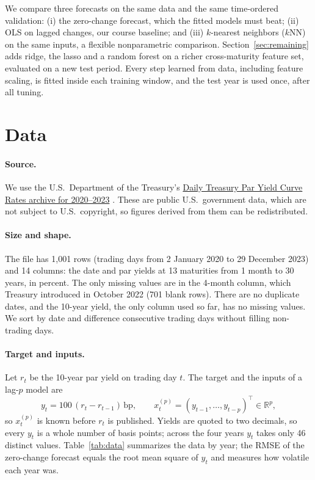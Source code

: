 \documentclass{article}
\newcommand{\bp}{\,\mathrm{bp}}
\begin{document}
We compare three forecasts on the same data and the same time-ordered validation: (i) the zero-change forecast, which the fitted models must beat; (ii) OLS on lagged changes, our course baseline; and (iii) $k$-nearest neighbors ($k$NN) on the same inputs, a flexible nonparametric comparison. Section~\ref{sec:remaining} adds ridge, the lasso and a random forest on a richer cross-maturity feature set, evaluated on a new test period. Every step learned from data, including feature scaling, is fitted inside each training window, and the test year is used once, after all tuning.

\section{Data}\label{sec:data}
\paragraph{Source.} We use the U.S.\ Department of the Treasury's \href{https://home.treasury.gov/resource-center/data-chart-center/interest-rates/daily-treasury-rate-archives/par-yield-curve-rates-2020-2023.csv}{Daily Treasury Par Yield Curve Rates archive for 2020--2023} \citep{treasury2020}. These are public U.S.\ government data, which are not subject to U.S.\ copyright, so figures derived from them can be redistributed.

\paragraph{Size and shape.} The file has 1,001 rows (trading days from 2 January 2020 to 29 December 2023) and 14 columns: the date and par yields at 13 maturities from 1 month to 30 years, in percent. The only missing values are in the 4-month column, which Treasury introduced in October 2022 (701 blank rows). There are no duplicate dates, and the 10-year yield, the only column used so far, has no missing values. We sort by date and difference consecutive trading days without filling non-trading days.

\paragraph{Target and inputs.} Let $r_t$ be the 10-year par yield on trading day $t$. The target and the inputs of a lag-$p$ model are
\begin{equation}
  y_t = 100\,(r_t - r_{t-1}) \bp, \qquad x_t^{(p)} = (y_{t-1}, \ldots, y_{t-p})^\top \in \mathbb{R}^p,
  \label{eq:features}
\end{equation}
so $x_t^{(p)}$ is known before $r_t$ is published. Yields are quoted to two decimals, so every $y_t$ is a whole number of basis points; across the four years $y_t$ takes only 46 distinct values. Table~\ref{tab:data} summarizes the data by year; the RMSE of the zero-change forecast equals the root mean square of $y_t$ and measures how volatile each year was.
\end{document}
